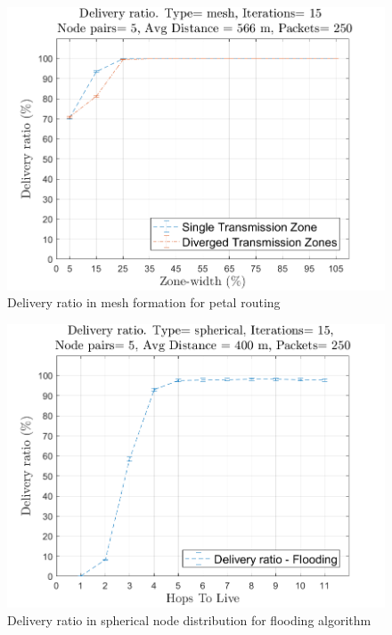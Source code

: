 \begin{figure}[hbtp]
\centering
\includegraphics[width=\simResultFigSize \textwidth]{ncsuthesis-0.6/Chapter-5/figs/pe_DR_mesh.png}
\caption{Delivery ratio in mesh formation for petal routing}
\label{fig:pe_DR_mesh}
\end{figure}

\begin{figure}[hbtp]
\centering
\includegraphics[width=\simResultFigSize \textwidth]{ncsuthesis-0.6/Chapter-5/figs/fl_DR_spherical.png}
\caption{Delivery ratio in spherical node distribution for flooding algorithm}
\label{fig:fl_DR_spherical}
\end{figure}

